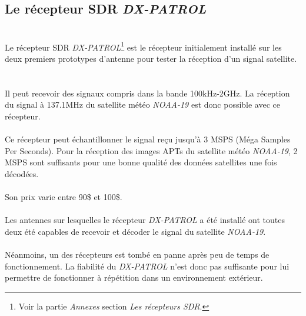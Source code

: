 \documentclass[12pt,fleqn]{book} %
\begin{document}
\subsection{Le récepteur SDR \emph{DX-PATROL}}
~\\Le récepteur SDR \emph{DX-PATROL}\footnote{Voir la partie \emph{Annexes} section \emph{Les récepteurs SDR}.} est le récepteur initialement installé sur les deux premiers prototypes d'antenne pour tester la réception d'un signal satellite. 
~\\\\Il peut recevoir des signaux compris dans la bande 100kHz-2GHz. La réception du signal à 137.1MHz du satellite météo \emph{NOAA-19} est donc possible avec ce récepteur. 
~\\\\Ce récepteur peut échantillonner le signal reçu jusqu'à 3 MSPS (Méga Samples Per Seconds). Pour la réception des images APTs du satellite météo \emph{NOAA-19}, 2 MSPS sont suffisants pour une bonne qualité des données satellites une fois décodées.
~\\\\Son prix varie entre 90\$ et 100\$.
~\\\\Les antennes sur lesquelles le récepteur \emph{DX-PATROL} a été installé ont toutes deux été capables de recevoir et décoder le signal du satellite \emph{NOAA-19}.
~\\\\Néanmoins, un des récepteurs est tombé en panne après peu de temps de fonctionnement. La fiabilité du \emph{DX-PATROL} n'est donc pas suffisante pour lui permettre de fonctionner à répétition dans un environnement extérieur.
\end{document}
